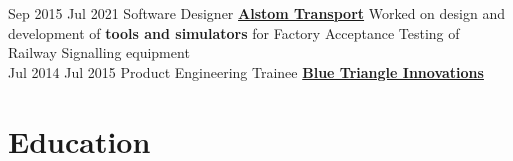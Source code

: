 \documentclass[letterpaper]{DS_class_file} %
\begin{document}
\begin{twenty}
	\twentyitem
		{Sep 2015}
		{Jul 2021}
		{Software Designer}
		{\href{https://www.alstom.com/alstom-india}{\textbf{Alstom Transport}}}
		{}
		{ Worked on design and development of \textbf{tools and simulators} for Factory Acceptance Testing of Railway Signalling equipment
        }
	\\
	\twentyitem
		{Jul 2014}
		{Jul 2015}
		{Product Engineering Trainee}
		{\href{}{\textbf{Blue Triangle Innovations}}}
		{}
		{}
\end{twenty}


\newpage

\makeseconda %

\section{\faUniversity Education}
\end{document}
